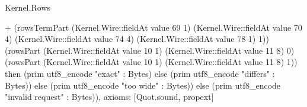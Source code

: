 \begin{lexlean}{Kernel.Rows}
\begin{semanticmodule}
{+ (rowsTermPart (Kernel.Wire::fieldAt value 69 1) (Kernel.Wire::fieldAt value 70 4) (Kernel.Wire::fieldAt value 74 4) (Kernel.Wire::fieldAt value 78 1) 1)) (rowsPart (Kernel.Wire::fieldAt value 10 1) (Kernel.Wire::fieldAt value 11 8) 0) (rowsPart (Kernel.Wire::fieldAt value 10 1) (Kernel.Wire::fieldAt value 11 8) 1)) then (prim utf8_encode "exact" : Bytes) else (prim utf8_encode "differs" : Bytes)) else (prim utf8_encode "too wide" : Bytes)) else (prim utf8_encode "invalid request" : Bytes)),
  axioms: [Quot.sound, propext]
}
\end{semanticmodule}
\end{lexlean}
